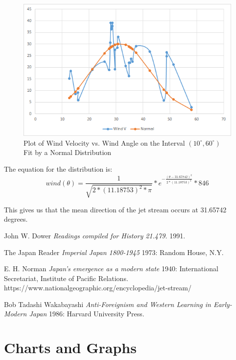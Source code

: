 \documentclass{article}
\begin{document}
\begin{figure}[H]
  \centering
  \includegraphics[width=\textwidth]{alan-data-2.png}
  \caption{Plot of Wind Velocity vs. Wind Angle on the Interval $(10^{\circ}, 60^{\circ})$ Fit by a Normal Distribution}
\end{figure}


The equation for the distribution is:
\[
wind(\theta) = \frac{1}{\sqrt{2*(11.18753)^2*\pi}}*e^{-\frac{(\theta-31.65742)^2}{2*(11.18753)^2}}*846
\]

This gives us that the mean direction of the jet stream occurs at 31.65742 degrees.




\begin{thebibliography}{1}

 John W. Dower {\em Readings compiled for History
21.479.}  1991.

  The Japan Reader {\em Imperial Japan 1800-1945} 1973:
Random House, N.Y.

 E. H. Norman {\em Japan's emergence as a modern
state} 1940: International Secretariat, Institute of Pacific
Relations. https://www.nationalgeographic.org/encyclopedia/jet-stream/

 Bob Tadashi Wakabayashi {\em Anti-Foreignism and Western
Learning in Early-Modern Japan} 1986: Harvard University Press.

\end{thebibliography}



\appendix
\section{Charts and Graphs}
\end{document}
